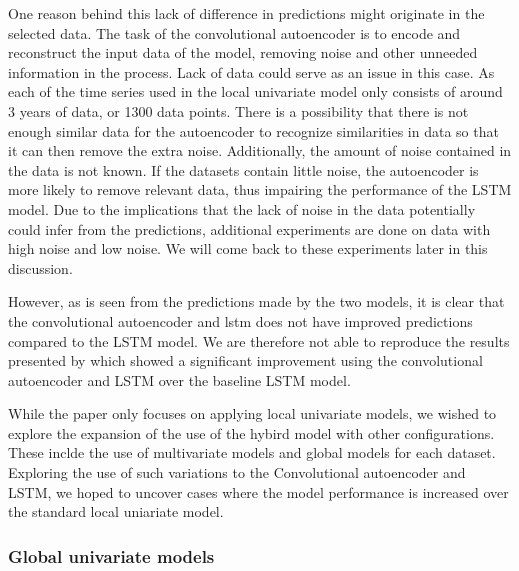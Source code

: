 One reason behind this lack of difference in predictions might originate in the selected data.
The task of the convolutional autoencoder is to encode and reconstruct the input data of the model, 
removing noise and other unneeded information in the process.
Lack of data could serve as an issue in this case.
As each of the time series used in the local univariate model only consists of around 3 years of data, or 1300 data points.
There is a possibility that there is not enough similar data for the autoencoder to recognize similarities in data
so that it can then remove the extra noise.
Additionally, the amount of noise contained in the data is not known.
If the datasets contain little noise, the autoencoder is more likely to remove relevant data, thus impairing the performance of the LSTM model.
Due to the implications that the lack of noise in the data potentially could infer from the predictions,
additional experiments are done on data with high noise and low noise.
We will come back to these experiments later in this discussion.

However, as is seen from the predictions made by the two models, it is clear that the convolutional autoencoder and lstm
does not have improved predictions compared to the LSTM model.
We are therefore not able to reproduce the results presented by \cite{Zhao2019}
which showed a significant improvement using the convolutional autoencoder and LSTM over the baseline LSTM model.



While the paper \cite{Zhao2019} only focuses on applying local univariate models,
we wished to explore the expansion of the use of the hybird model with other configurations.
These inclde the use of multivariate models and global models for each dataset.
Exploring the use of such variations to the Convolutional autoencoder and LSTM,
we hoped to uncover cases where the model performance is increased over the standard local uniariate model.



\subsubsection{Global univariate models}



